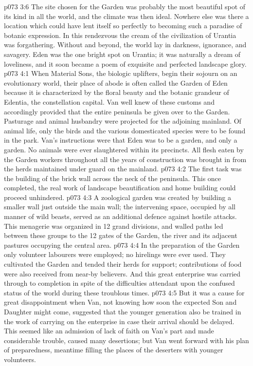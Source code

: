 \vs p073 3:6 The site chosen for the Garden was probably the most beautiful spot of its kind in all the world, and the climate was then ideal. Nowhere else was there a location which could have lent itself so perfectly to becoming such a paradise of botanic expression. In this rendezvous the cream of the civilization of Urantia was forgathering. Without and beyond, the world lay in darkness, ignorance, and savagery. Eden was the one bright spot on Urantia; it was naturally a dream of loveliness, and it soon became a poem of exquisite and perfected landscape glory.
\vs p073 4:1 When Material Sons, the biologic uplifters, begin their sojourn on an evolutionary world, their place of abode is often called the Garden of Eden because it is characterized by the floral beauty and the botanic grandeur of Edentia, the constellation capital. Van well knew of these customs and accordingly provided that the entire peninsula be given over to the Garden. Pasturage and animal husbandry were projected for the adjoining mainland. Of animal life, only the birds and the various domesticated species were to be found in the park. Van’s instructions were that Eden was to be a garden, and only a garden. No animals were ever slaughtered within its precincts. All flesh eaten by the Garden workers throughout all the years of construction was brought in from the herds maintained under guard on the mainland.
\vs p073 4:2 The first task was the building of the brick wall across the neck of the peninsula. This once completed, the real work of landscape beautification and home building could proceed unhindered.
\vs p073 4:3 A zoological garden was created by building a smaller wall just outside the main wall; the intervening space, occupied by all manner of wild beasts, served as an additional defence against hostile attacks. This menagerie was organized in 12 grand divisions, and walled paths led between these groups to the 12 gates of the Garden, the river and its adjacent pastures occupying the central area.
\vs p073 4:4 In the preparation of the Garden only volunteer labourers were employed; no hirelings were ever used. They cultivated the Garden and tended their herds for support; contributions of food were also received from near\hyp{}by believers. And this great enterprise was carried through to completion in spite of the difficulties attendant upon the confused status of the world during these troublous times.
\vs p073 4:5 But it was a cause for great disappointment when Van, not knowing how soon the expected Son and Daughter might come, suggested that the younger generation also be trained in the work of carrying on the enterprise in case their arrival should be delayed. This seemed like an admission of lack of faith on Van’s part and made considerable trouble, caused many desertions; but Van went forward with his plan of preparedness, meantime filling the places of the deserters with younger volunteers.
